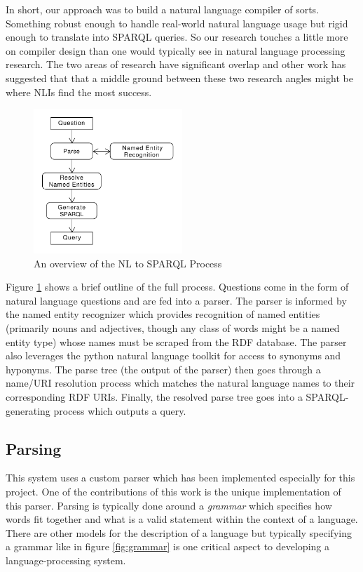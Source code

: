 \documentclass[11pt]{article}
\begin{document}
{In short, our approach was to build a natural language compiler of sorts. Something
robust enough to handle real-world natural language usage but rigid enough to translate
into SPARQL queries. So our research touches a little more on compiler design than 
one would typically see in natural language processing research.
The two areas of research have significant 
overlap\cite{chomsky, reghizzi} and other work has suggested that that a middle ground 
between these two research angles might be where NLIs find the most success\cite{usability}.


\begin{figure}[h!]
    \centering
    \includegraphics[width=0.5\textwidth,natwidth=1,natheight=1]{umlet/usage.pdf}
    \caption{An overview of the NL to SPARQL Process}
    \label{fig:process}
\end{figure}

Figure \ref{fig:process} shows a brief outline of the full process. Questions come
in the form of natural language questions and are fed into a parser. The parser is
informed by the named entity recognizer which provides recognition of named entities
(primarily nouns and adjectives, though any class of words might be a named entity
type) whose names must be scraped from the RDF database. The parser also 
leverages the python natural language toolkit\cite{nltk} for access to synonyms and
hyponyms. The parse tree (the output of the parser) then goes through a name/URI 
resolution process which matches the natural language names to their corresponding
RDF URIs. Finally, the resolved parse tree goes into a SPARQL-generating process 
which outputs a query.

\subsection{Parsing}

This system uses a custom parser which has been implemented especially for
this project. One of the contributions of this work is the unique implementation
of this parser. Parsing is typically done around a {\em grammar} which specifies how
words fit together and what is a valid statement within the context of a language.
There are other models for the description of a language\cite{chomsky} but
typically specifying a grammar like in figure \ref{fig:grammar} is one critical
aspect to developing a language-processing system.

}
\end{document}
